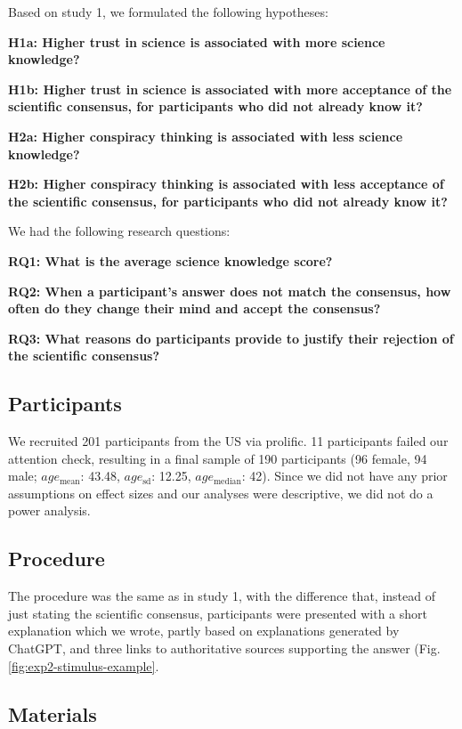 \documentclass[
  doc,floatsintext]{apa6}
\begin{document}
Based on study 1, we formulated the following hypotheses:

\textbf{H1a: Higher trust in science is associated with more science knowledge?}

\textbf{H1b: Higher trust in science is associated with more acceptance of the scientific consensus, for participants who did not already know it?}

\textbf{H2a: Higher conspiracy thinking is associated with less science knowledge?}

\textbf{H2b: Higher conspiracy thinking is associated with less acceptance of the scientific consensus, for participants who did not already know it?}

We had the following research questions:

\textbf{RQ1: What is the average science knowledge score?}

\textbf{RQ2: When a participant's answer does not match the consensus, how often do they change their mind and accept the consensus?}

\textbf{RQ3: What reasons do participants provide to justify their rejection of the scientific consensus?}

\subsection{Participants}\label{participants-2}

We recruited 201 participants from the US via prolific. 11 participants failed our attention check, resulting in a final sample of 190 participants (96 female, 94 male; \(age_\text{mean}\): 43.48, \(age_\text{sd}\): 12.25, \(age_\text{median}\): 42). Since we did not have any prior assumptions on effect sizes and our analyses were descriptive, we did not do a power analysis.

\subsection{Procedure}\label{procedure-1}

The procedure was the same as in study 1, with the difference that, instead of just stating the scientific consensus, participants were presented with a short explanation which we wrote, partly based on explanations generated by ChatGPT, and three links to authoritative sources supporting the answer (Fig. \ref{fig:exp2-stimulus-example}.

\subsection{Materials}\label{materials-3}
\end{document}
